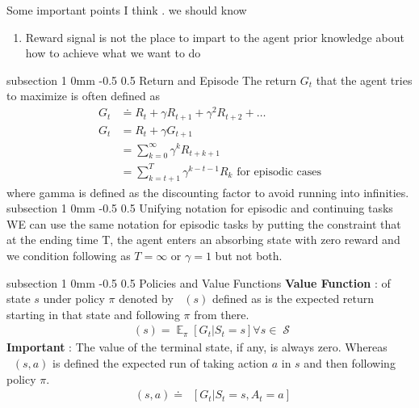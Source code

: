 \documentclass[twocolumn,11pt]{article}
\makeatletter
\DeclareMathOperator{\E}{\mathbb{E}}
\DeclareMathOperator{\State}{\mathcal{S}}
\DeclareMathOperator{\qp}{q_\pi} %
\DeclareMathOperator{\vp}{v_\pi} %
\DeclareMathOperator{\Ep}{\E_\pi}
\renewcommand{\subsection}{\@startsection
{subsection}%
{1}%
{0mm}%
{-0.5\baselineskip}%
{0.5\baselineskip}%
{\bfseries\color{blue}}} %
\makeatother
\begin{document}
Some important points I think . we should know
\begin{enumerate}
    \item Reward signal is not the place to impart to the agent prior knowledge about how to achieve what we want to do 
\end{enumerate}

\subsection{Return  and Episode}
The return $G_t$ that the agent tries to maximize is often defined as \useshortskip
\begin{align}
G_t &\doteq R_t + \gamma R_{t+1} + \gamma^2 R_{t+2} + \ldots\\
G_t &= R_t + \gamma G_{t+1} \\
&= \sum_{k=0}^{\infty} \gamma^k R_{t+k+1}\\
&= \sum_{k = t+1}^{T} \gamma^{k - t-  1}R_k \text{ for episodic cases}
\end{align}\useshortskip
where gamma is defined as the discounting factor to avoid running into infinities. 
\subsection{Unifying notation for episodic and continuing tasks}
WE can use the same notation for episodic tasks by putting the constraint that at the ending time T, the agent enters an absorbing state with zero reward and we condition following as $T = \infty \text{ or } \gamma = 1$ but not both.  

\subsection{Policies and Value Functions}
\textbf{Value Function }: of state $s$ under policy $\pi$ denoted by $\vp(s)$ defined as is the expected return starting in that state and following $\pi$ from there.
\begin{align}\label{eq:vpi}
    \vp(s) = \E_\pi [G_t | S_t =s] \forall s \in \State
\end{align}
\textbf{Important} : The value of the terminal state, if any, is always zero.  
Whereas $\qp(s,a)$ is defined the expected run of taking action $a$ in $s$ and then following policy $\pi$.
\begin{align}\label{eq:qpi}
    \qp(s,a) \doteq \Ep[ G_t | S_t = s, A_t = a]
\end{align}
\end{document}

